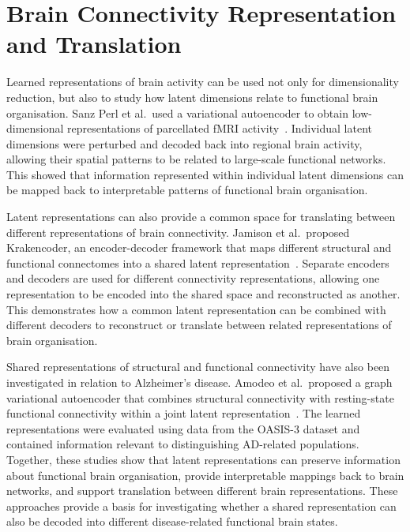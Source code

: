 \section{Brain Connectivity Representation and Translation}

Learned representations of brain activity can be used not only for dimensionality reduction, but also to study how latent dimensions relate to functional brain organisation. 
Sanz Perl et al.\ used a variational autoencoder to obtain low-dimensional representations of parcellated fMRI activity~\cite{SanzPerl2025}. 
Individual latent dimensions were perturbed and decoded back into regional brain activity, allowing their spatial patterns to be related to large-scale functional networks. 
This showed that information represented within individual latent dimensions can be mapped back to interpretable patterns of functional brain organisation.

Latent representations can also provide a common space for translating between different representations of brain connectivity. 
Jamison et al.\ proposed Krakencoder, an encoder-decoder framework that maps different structural and functional connectomes into a shared latent representation~\cite{Jamison2025}. 
Separate encoders and decoders are used for different connectivity representations, allowing one representation to be encoded into the shared space and reconstructed as another. 
This demonstrates how a common latent representation can be combined with different decoders to reconstruct or translate between related representations of brain organisation.

Shared representations of structural and functional connectivity have also been investigated in relation to Alzheimer’s disease. 
Amodeo et al.\ proposed a graph variational autoencoder that combines structural connectivity with resting-state functional connectivity within a joint latent representation~\cite{Amodeo2022}. 
The learned representations were evaluated using data from the OASIS-3 dataset and contained information relevant to distinguishing AD-related populations. 
Together, these studies show that latent representations can preserve information about functional brain organisation, provide interpretable mappings back to brain networks, and support translation between different brain representations. 
These approaches provide a basis for investigating whether a shared representation can also be decoded into different disease-related functional brain states.
